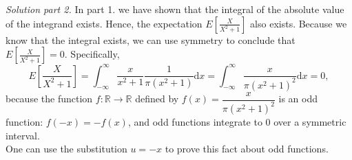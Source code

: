 \documentclass[12pt]{article}
\begin{document}
\textit{Solution part 2.} In part 1. we have shown that the integral of the absolute value of the integrand exists. Hence, the expectation $E \left[\frac{X}{X^2+1}\right]$ also exists.
Because we know that the integral exists, we can use symmetry to conclude that  $E \left[\frac{X}{X^2+1}\right] = 0$. Specifically,
$$E \left[\frac{X}{X^2+1}\right] = \int_{-\infty}^\infty \frac{x}{x^2+1} \frac{1}{\pi(x^2+1)} \mathrm{d}x = \int_{-\infty}^\infty \frac{x}{\pi(x^2+1)^2} \mathrm{d}x = 0,$$
because the function $f : \mathbb R \rightarrow \mathbb R$ defined by $f(x) =   \dfrac{x}{\pi(x^2+1)^2}$ is an odd function: $f(-x) = -f(x)$, and odd functions integrate to 0 over a symmetric interval. \\ One can use the substitution $u = -x$ to prove this fact about odd functions.
\end{document}
